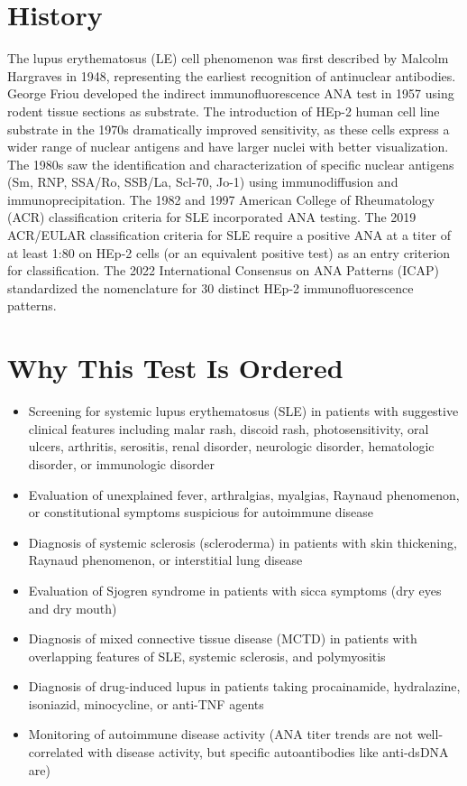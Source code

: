\section*{History}
The lupus erythematosus (LE) cell phenomenon was first described by Malcolm Hargraves in 1948, representing the earliest recognition of antinuclear antibodies. George Friou developed the indirect immunofluorescence ANA test in 1957 using rodent tissue sections as substrate. The introduction of HEp-2 human cell line substrate in the 1970s dramatically improved sensitivity, as these cells express a wider range of nuclear antigens and have larger nuclei with better visualization. The 1980s saw the identification and characterization of specific nuclear antigens (Sm, RNP, SSA/Ro, SSB/La, Scl-70, Jo-1) using immunodiffusion and immunoprecipitation. The 1982 and 1997 American College of Rheumatology (ACR) classification criteria for SLE incorporated ANA testing. The 2019 ACR/EULAR classification criteria for SLE require a positive ANA at a titer of at least 1:80 on HEp-2 cells (or an equivalent positive test) as an entry criterion for classification. The 2022 International Consensus on ANA Patterns (ICAP) standardized the nomenclature for 30 distinct HEp-2 immunofluorescence patterns.

\section*{Why This Test Is Ordered}
\begin{itemize}
  \item Screening for systemic lupus erythematosus (SLE) in patients with suggestive clinical features including malar rash, discoid rash, photosensitivity, oral ulcers, arthritis, serositis, renal disorder, neurologic disorder, hematologic disorder, or immunologic disorder
  \item Evaluation of unexplained fever, arthralgias, myalgias, Raynaud phenomenon, or constitutional symptoms suspicious for autoimmune disease
  \item Diagnosis of systemic sclerosis (scleroderma) in patients with skin thickening, Raynaud phenomenon, or interstitial lung disease
  \item Evaluation of Sjogren syndrome in patients with sicca symptoms (dry eyes and dry mouth)
  \item Diagnosis of mixed connective tissue disease (MCTD) in patients with overlapping features of SLE, systemic sclerosis, and polymyositis
  \item Diagnosis of drug-induced lupus in patients taking procainamide, hydralazine, isoniazid, minocycline, or anti-TNF agents
  \item Monitoring of autoimmune disease activity (ANA titer trends are not well-correlated with disease activity, but specific autoantibodies like anti-dsDNA are)
\end{itemize}

